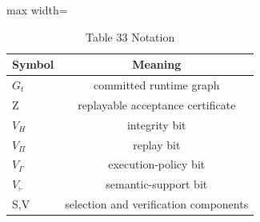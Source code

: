 \begin{table}[tbp]
\centering
\footnotesize
\caption{Table 33 Notation}
\label{tab:table_33_notation}
\begin{adjustbox}{max width=\linewidth}
\begin{tabular}{lc}
\toprule
Symbol & Meaning \\
\midrule
$G_t$ & committed runtime graph \\
Z & replayable acceptance certificate \\
$V_H$ & integrity bit \\
$V_\Pi$ & replay bit \\
$V_\Gamma$ & execution-policy bit \\
$V_\vdash$ & semantic-support bit \\
S,V & selection and verification components \\
\bottomrule
\end{tabular}
\end{adjustbox}
\end{table}
